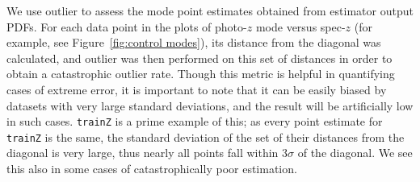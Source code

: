 \documentclass[fleqn,usenatbib,useAMS]{mnras}
\newcommand{\PersonalTag}[3]{{\color{#2}{$^{#1}$ [#3}]}}
\newcommand{\aim}[1]{\PersonalTag{Alex}{violet}{#1}}
\newcommand{\rachel}[1]{\PersonalTag{Rachel}{orange}{#1}}
\newcommand{\revone}[2]{{\color{black}{#2}}}
\newcommand{\code}[1]{\texttt{#1}\xspace}
\newcommand{\trainz}{\code{TrainZ}}
\begin{document}
    We use outlier \revone{rejection}{identification} to assess the mode point estimates obtained from estimator output PDFs. 
    For each data point in the plots of photo-$z$ mode versus spec-$z$ (for example, see Figure~\ref{fig:control modes}), its distance from the diagonal was calculated, and outlier \revone{rejection}{identification} was then performed on this set of distances in order to obtain a catastrophic outlier rate. 
    Though this metric is helpful in quantifying cases of extreme error, it is important to note that it can be easily biased by datasets with very large standard deviations, and the result will be artificially low in such cases. 
    \texttt{trainZ} is a prime example of this; as every point estimate for \texttt{trainZ} is the same, the standard deviation of the set of their distances from the diagonal is very large, thus nearly all points fall within $3\sigma$ of the diagonal. 
    We see this also in some cases of catastrophically poor estimation. 
    \label{sec:outlier rejection}



\end{document}
